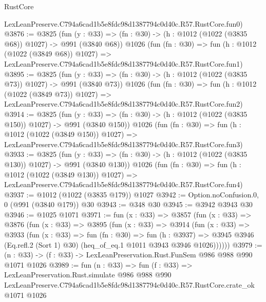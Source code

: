 \begin{lexlean}{RustCore}
\begin{coremodule}
    LexLeanPreserve.C794a6cad1b5e8fdc98d1387794c0d40c.R57.RustCore.fun0)
@3876 := @3825
    (fun (y : @33) => (fn : @30) -> (h : @1012 (@1022 (@3835 @68)) @1027) -> @991 (@3840 @68))
    @1026
    (fun (fn : @30) =>
    fun (h : @1012 (@1022 (@3849 @68)) @1027) =>
    LexLeanPreserve.C794a6cad1b5e8fdc98d1387794c0d40c.R57.RustCore.fun1)
@3895 := @3825
    (fun (y : @33) => (fn : @30) -> (h : @1012 (@1022 (@3835 @73)) @1027) -> @991 (@3840 @73))
    @1026
    (fun (fn : @30) =>
    fun (h : @1012 (@1022 (@3849 @73)) @1027) =>
    LexLeanPreserve.C794a6cad1b5e8fdc98d1387794c0d40c.R57.RustCore.fun2)
@3914 := @3825
    (fun (y : @33) => (fn : @30) -> (h : @1012 (@1022 (@3835 @150)) @1027) -> @991 (@3840 @150))
    @1026
    (fun (fn : @30) =>
    fun (h : @1012 (@1022 (@3849 @150)) @1027) =>
    LexLeanPreserve.C794a6cad1b5e8fdc98d1387794c0d40c.R57.RustCore.fun3)
@3933 := @3825
    (fun (y : @33) => (fn : @30) -> (h : @1012 (@1022 (@3835 @130)) @1027) -> @991 (@3840 @130))
    @1026
    (fun (fn : @30) =>
    fun (h : @1012 (@1022 (@3849 @130)) @1027) =>
    LexLeanPreserve.C794a6cad1b5e8fdc98d1387794c0d40c.R57.RustCore.fun4)
@3937 := @1012 (@1022 (@3835 @179)) @1027
@3942 := Option.noConfusion.{0, 0} (@991 (@3840 @179)) @30
@3943 := @348 @30
@3945 := @3942 @3943 @30
@3946 := @1025 @1071
@3971 := fun (x : @33) =>
  @3857
    (fun (x : @33) =>
    @3876
      (fun (x : @33) =>
      @3895
        (fun (x : @33) =>
        @3914
          (fun (x : @33) =>
          @3933
            (fun (x : @33) =>
            fun (fn : @30) =>
            fun (h : @3937) =>
            @3945 @3946 (Eq.refl.{2} (Sort 1) @30) (heq_of_eq.{1} @1011 @3943 @3946 @1026))))))
@3979 := (n : @33) -> (f : @33) -> LexLeanPreservation.Rust.FunSem @986 @988 @990 @1071 @1026
@3989 := fun (n : @33) =>
  fun (f : @33) =>
  LexLeanPreservation.Rust.simulate
    @986
    @988
    @990
    LexLeanPreserve.C794a6cad1b5e8fdc98d1387794c0d40c.R57.RustCore.crate_ok
    @1071
    @1026
\end{coremodule}
\end{lexlean}
